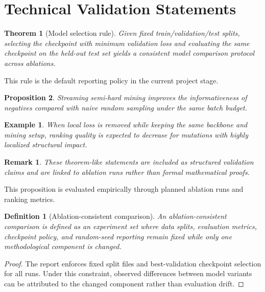 \documentclass[unnumsec,webpdf,contemporary,large]{oup-authoring-template}%
\theoremstyle{thmstyleone}%
\newtheorem{theorem}{Theorem}%
\newtheorem{proposition}[theorem]{Proposition}%
\theoremstyle{thmstyletwo}%
\newtheorem{example}{Example}%
\newtheorem{remark}{Remark}%
\theoremstyle{thmstylethree}%
\newtheorem{definition}{Definition}
\begin{document}
\section{Technical Validation Statements}\label{sec10}


\begin{theorem}[Model selection rule]\label{thm1}
Given fixed train/validation/test splits, selecting the checkpoint with minimum validation loss and evaluating the same checkpoint on the held-out test set yields a consistent model comparison protocol across ablations.
\end{theorem}

This rule is the default reporting policy in the current project stage.

\begin{proposition}
Streaming semi-hard mining improves the informativeness of negatives compared with naive random sampling under the same batch budget.
\end{proposition}

\begin{example}
When local loss is removed while keeping the same backbone and mining setup, ranking quality is expected to decrease for mutations with highly localized structural impact.
\end{example}

\begin{remark}
These theorem-like statements are included as structured validation claims and are linked to ablation runs rather than formal mathematical proofs.
\end{remark}

This proposition is evaluated empirically through planned ablation runs and ranking metrics.

\begin{definition}[Ablation-consistent comparison]
An ablation-consistent comparison is defined as an experiment set where data splits, evaluation metrics, checkpoint policy, and random-seed reporting remain fixed while only one methodological component is changed.
\end{definition}

\begin{proof}The report enforces fixed split files and best-validation checkpoint selection for all runs. Under this constraint, observed differences between model variants can be attributed to the changed component rather than evaluation drift.
\end{proof}
\end{document}
